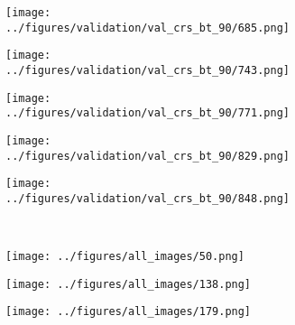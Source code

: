 \begin{figure}[h!]
\begin{subfigure}[b]{0.03\textwidth}
	\centering
\end{subfigure}
\hspace{0.05cm}
	\begin{subfigure}{0.18\textwidth}
		\centering
		\texttt{[image: ../figures/validation/val\_crs\_bt\_90/685.png]}
		\label{fig:1}
	\end{subfigure}
	\begin{subfigure}{0.18\textwidth}
		\centering
		\texttt{[image: ../figures/validation/val\_crs\_bt\_90/743.png]}
		\label{fig:1}
	\end{subfigure}
	\begin{subfigure}{0.18\textwidth}
		\centering
		\texttt{[image: ../figures/validation/val\_crs\_bt\_90/771.png]}
		\label{fig:1}
	\end{subfigure}
	\begin{subfigure}{0.18\textwidth}
		\centering
		\texttt{[image: ../figures/validation/val\_crs\_bt\_90/829.png]}
		\label{fig:1}
	\end{subfigure}
	\begin{subfigure}{0.18\textwidth}
		\centering
		\texttt{[image: ../figures/validation/val\_crs\_bt\_90/848.png]}
		\label{fig:1}
	\end{subfigure}
	\vspace{0.5cm}
	\\
	\begin{subfigure}[b]{0.03\textwidth} %
		\centering
	\end{subfigure}
	\hspace{0.05cm}
	\begin{subfigure}{0.18\textwidth}
		\centering
		\texttt{[image: ../figures/all\_images/50.png]}
		\label{fig:1}
	\end{subfigure}
	\begin{subfigure}{0.18\textwidth}
		\centering
		\texttt{[image: ../figures/all\_images/138.png]}
		\label{fig:1}
	\end{subfigure}
	\begin{subfigure}{0.18\textwidth}
		\centering
		\texttt{[image: ../figures/all\_images/179.png]}
		\label{fig:1}
	\end{subfigure}
	\begin{subfigure}{0.18\textwidth}

\end{subfigure}
\end{figure}
